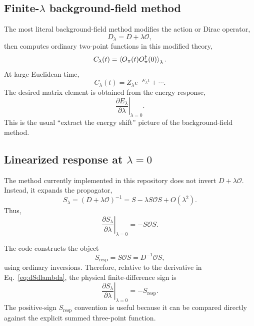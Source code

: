 \documentclass[11pt,a4paper]{article}
\newcommand{\Dslash}{D}
\newcommand{\Slambda}{S_\lambda}
\newcommand{\Szero}{S}
\newcommand{\Sresp}{S_{\mathrm{resp}}}
\newcommand{\Ocur}{\mathcal{O}}
\begin{document}
\subsection{Finite-\(\lambda\) background-field method}

The most literal background-field method modifies the action or Dirac operator,
\begin{equation}
  \Dslash_\lambda = \Dslash + \lambda \Ocur,
\end{equation}
then computes ordinary two-point functions in this modified theory,
\begin{equation}
  C_\lambda(t)
  =
  \braket{
    O_\pi(t) O_\pi^\dagger(0)
  }_\lambda .
\end{equation}
At large Euclidean time,
\begin{equation}
  C_\lambda(t)
  =
  Z_\lambda e^{-E_\lambda t}
  + \cdots .
\end{equation}
The desired matrix element is obtained from the energy response,
\begin{equation}
  \left.\frac{\partial E_\lambda}{\partial\lambda}\right|_{\lambda=0}.
\end{equation}
This is the usual ``extract the energy shift'' picture of the background-field
method.

\subsection{Linearized response at \(\lambda=0\)}

The method currently implemented in this repository does not invert
\(\Dslash+\lambda\Ocur\).  Instead, it expands the propagator,
\begin{equation}
  \Slambda
  =
  (\Dslash + \lambda \Ocur)^{-1}
  =
  \Szero - \lambda \Szero \Ocur \Szero + O(\lambda^2).
\end{equation}
Thus,
\begin{equation}
  \left.
  \frac{\partial \Slambda}{\partial\lambda}
  \right|_{\lambda=0}
  =
  - \Szero \Ocur \Szero.
\label{eq:dSdlambda}
\end{equation}

The code constructs the object
\begin{equation}
  \Sresp
  =
  \Szero \Ocur \Szero
  =
  \Dslash^{-1} \Ocur \Szero,
\label{eq:Sresponse_code_sign}
\end{equation}
using ordinary inversions.  Therefore, relative to the derivative in
Eq.~\eqref{eq:dSdlambda}, the physical finite-difference sign is
\begin{equation}
  \left.
  \frac{\partial \Slambda}{\partial\lambda}
  \right|_{\lambda=0}
  =
  -\Sresp.
\end{equation}
The positive-sign \(\Sresp\) convention is useful because it can be compared
directly against the explicit summed three-point function.
\end{document}
